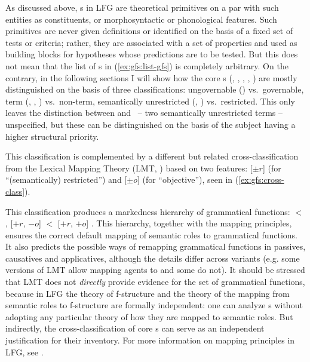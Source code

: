 \documentclass[output=paper]{../langscibook}
\begin{document}
 As discussed above, {\GF}s in LFG are theoretical primitives on a par with such entities as constituents, or morphosyntactic or phonological features. Such primitives are never given definitions or identified on the basis of a fixed set of tests or criteria; rather, they are associated with a set of properties and used as building blocks for hypotheses whose predictions are to be tested. But this does not mean that the list of {\GF}s in (\ref{ex:gfs:list-gfs}) is completely arbitrary. On the contrary, in the following sections I will show how the core {\GF}s (\SUBJ, \OBJ, {\OBJTHETA}, {\OBLTHETA}, \ADJ) are mostly distinguished on the basis of three classifications: ungovernable (\ADJ) vs.\ governable, term (\SUBJ, \OBJ, {\OBJTHETA}) vs.\ non-term, semantically unrestricted (\SUBJ, \OBJ) vs.\ restricted. This only leaves the distinction between \SUBJ and \OBJ\ -- two semantically unrestricted terms -- unspecified, but these can be distinguished on the basis of the subject having a higher structural priority.
 
 This classification is complemented by a different but related cross-classifica\-tion from the Lexical Mapping Theory (LMT,  \cite{bresnan1989locative}) based on two features: [$\pm{r}$] (for ``(semantically) restricted'') and [$\pm{o}$] (for ``objective''), seen in (\ref{ex:gfs:cross-class}).
 
 
 This classification produces a markedness hierarchy of grammatical functions: \SUBJ [$-r$, $-{o}$] $<$ \OBJ [$-r$, $+{o}$],  {\OBLTHETA} [$+{r}$, $-{o}$]  $<$ {\OBJTHETA} [$+{r}$, $+{o}$] \citep{BresMosh90}. This hierarchy, together with the mapping principles, ensures the correct default mapping of semantic roles to grammatical functions. It also predicts the possible ways of remapping grammatical functions in passives, causatives and applicatives, although the details differ across variants (e.g. some versions of LMT allow mapping agents to \OBJ and some do not). It should be stressed that LMT does not \textit{directly} provide evidence for the set of grammatical functions, because in LFG the theory of f-structure and the theory of the mapping from semantic roles to f-structure are formally independent: one can analyze {\GF}s without adopting any particular theory of how they are mapped to semantic roles. But indirectly, the cross-classification of core {\GF}s can serve as an independent justification for their inventory. For more information on mapping principles in LFG, see .
 
\end{document}
